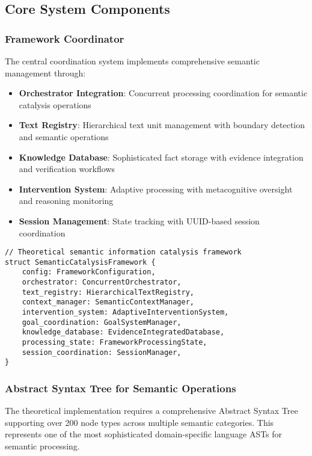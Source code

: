 \documentclass[12pt,a4paper,twoside]{article}
\begin{document}
\subsection{Core System Components}

\subsubsection{Framework Coordinator}

The central coordination system implements comprehensive semantic management through:

\begin{itemize}
\item \textbf{Orchestrator Integration}: Concurrent processing coordination for semantic catalysis operations
\item \textbf{Text Registry}: Hierarchical text unit management with boundary detection and semantic operations
\item \textbf{Knowledge Database}: Sophisticated fact storage with evidence integration and verification workflows
\item \textbf{Intervention System}: Adaptive processing with metacognitive oversight and reasoning monitoring
\item \textbf{Session Management}: State tracking with UUID-based session coordination
\end{itemize}

\begin{lstlisting}[caption=Theoretical Framework Coordinator Structure]
// Theoretical semantic information catalysis framework
struct SemanticCatalysisFramework {
    config: FrameworkConfiguration,
    orchestrator: ConcurrentOrchestrator,
    text_registry: HierarchicalTextRegistry,
    context_manager: SemanticContextManager,
    intervention_system: AdaptiveInterventionSystem,
    goal_coordination: GoalSystemManager,
    knowledge_database: EvidenceIntegratedDatabase,
    processing_state: FrameworkProcessingState,
    session_coordination: SessionManager,
}
\end{lstlisting}

\subsubsection{Abstract Syntax Tree for Semantic Operations}

The theoretical implementation requires a comprehensive Abstract Syntax Tree supporting over 200 node types across multiple semantic categories. This represents one of the most sophisticated domain-specific language ASTs for semantic processing.
\end{document}
